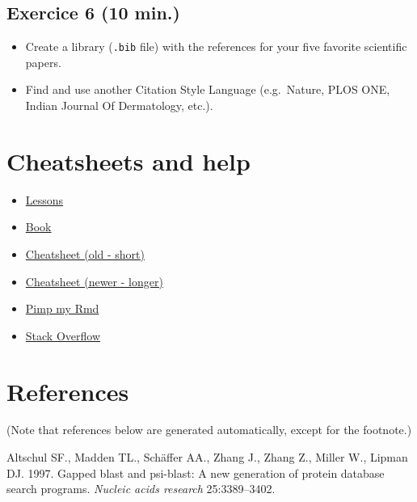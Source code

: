 \documentclass[]{article}
\begin{document}
\hypertarget{exercice-6-10-min.}{%
\subsection{Exercice 6 (10 min.)}\label{exercice-6-10-min.}}

\begin{itemize}
\item
  Create a library (\texttt{.bib} file) with the references for your
  five favorite scientific papers.
\item
  Find and use another Citation Style Language (e.g.~Nature, PLOS ONE,
  Indian Journal Of Dermatology, etc.).
\end{itemize}

\hypertarget{cheatsheets-and-help}{%
\section{Cheatsheets and help}\label{cheatsheets-and-help}}

\begin{itemize}
\item
  \href{https://rmarkdown.rstudio.com/lesson-1.html}{Lessons}
\item
  \href{https://bookdown.org/yihui/rmarkdown/}{Book}
\item
  \href{https://www.rstudio.com/wp-content/uploads/2015/02/rmarkdown-cheatsheet.pdf}{Cheatsheet
  (old - short)}
\item
  \href{https://www.rstudio.com/wp-content/uploads/2016/03/rmarkdown-cheatsheet-2.0.pdf}{Cheatsheet
  (newer - longer)}
\item
  \href{https://holtzy.github.io/Pimp-my-rmd/}{Pimp my Rmd}
\item
  \href{https://stackoverflow.com/}{Stack Overflow}
\end{itemize}

\hypertarget{references}{%
\section{References}\label{references}}

(Note that references below are generated automatically, except for the
footnote.)

\hypertarget{refs}{}
\leavevmode\hypertarget{ref-altschul1997gapped}{}%
Altschul SF., Madden TL., Schäffer AA., Zhang J., Zhang Z., Miller W.,
Lipman DJ. 1997. Gapped blast and psi-blast: A new generation of protein
database search programs. \emph{Nucleic acids research} 25:3389--3402.
\end{document}
